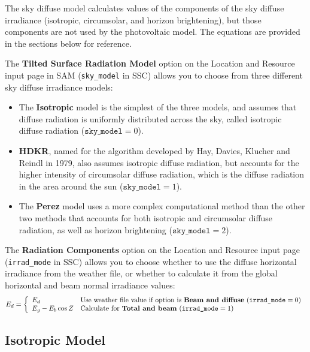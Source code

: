 \documentclass[12pt,letterpaper]{article}
\begin{document}
The sky diffuse model calculates values of the components of the sky diffuse irradiance (isotropic, circumsolar, and horizon brightening), but those components are not used by the photovoltaic model. The equations are provided in the sections below for reference.%

The \textbf{Tilted Surface Radiation Model} option on the Location and Resource input page in SAM (\texttt{sky\_model} in SSC) allows you to choose from three different sky diffuse irradiance models:

\begin{itemize}
\item The \textbf{Isotropic} model is the simplest of the three models, and assumes that diffuse radiation is uniformly distributed across the sky, called isotropic diffuse radiation ($\mathtt{sky\_model} = 0$).
\item \textbf{HDKR}, named for the algorithm developed by Hay, Davies, Klucher and Reindl in 1979, also assumes isotropic diffuse radiation, but accounts for the higher intensity of circumsolar diffuse radiation, which is the diffuse radiation in the area around the sun ($\mathtt{sky\_model} = 1$).
\item The \textbf{Perez} model uses a more complex computational method than the other two methods that accounts for both isotropic and circumsolar diffuse radiation, as well as horizon brightening ($\mathtt{sky\_model} = 2$). 
\end{itemize}

The \textbf{Radiation Components} option on the Location and Resource input page (\texttt{irrad\_mode} in SSC) allows you to choose whether to use the diffuse horizontal irradiance from the weather file, or whether to calculate it from the global horizontal and beam normal irradiance values:
\begin{equation}\label{eqn-diffhoriz}
E_d = \left\{
\begin{array}{ll}
E_d & \text{Use weather file value if option is \textbf{Beam and diffuse} ($\texttt{irrad\_mode}=0)$}\\
E_g - E_b\cos Z & \text{Calculate for \textbf{Total and beam} ($\texttt{irrad\_mode}=1)$}
\end{array}
\right.
\end{equation}

\subsection{Isotropic Model}\label{sec-isotropic}
\end{document}

